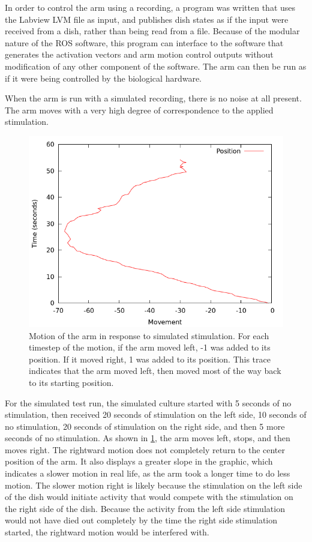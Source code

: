 \documentclass[letterpaper]{article}
\begin{document}
In order to control the arm using a recording, a program was written that uses the Labview LVM file as input, and publishes dish states as if the input were received from a dish, rather than being read from a file. 
Because of the modular nature of the ROS software, this program can interface to the software that generates the activation vectors and arm motion control outputs without modification of any other component of the software. 
The arm can then be run as if it were being controlled by the biological hardware. 

When the arm is run with a simulated recording, there is no noise at all present. 
The arm moves with a very high degree of correspondence to the applied stimulation. 

\begin{figure}
	\centering
	\includegraphics[width=\linewidth]{simulated_motion.png}
	\caption{Motion of the arm in response to simulated stimulation. 
	For each timestep of the motion, if the arm moved left, -1 was added to its position. If it moved right, 1 was added to its position. 
	This trace indicates that the arm moved left, then moved most of the way back to its starting position.}
	\label{fig:motion_sim}
\end{figure}

For the simulated test run, the simulated culture started with 5 seconds of no stimulation, then received 20 seconds of stimulation on the left side, 10 seconds of no stimulation, 20 seconds of stimulation on the right side, and then 5 more seconds of no stimulation. 
As shown in \ref{fig:motion_sim}, the arm moves left, stops, and then moves right. 
The rightward motion does not completely return to the center position of the arm. 
It also displays a greater slope in the graphic, which indicates a slower motion in real life, as the arm took a longer time to do less motion.
The slower motion right is likely because the stimulation on the left side of the dish would initiate activity that would compete with the stimulation on the right side of the dish.
Because the activity from the left side stimulation would not have died out completely by the time the right side stimulation started, the rightward motion would be interfered with. 
\end{document}
